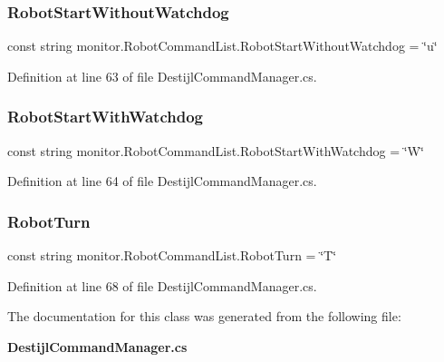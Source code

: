 \subsubsection{Robot\+Start\+Without\+Watchdog}
{\footnotesize\ttfamily const string monitor.\+Robot\+Command\+List.\+Robot\+Start\+Without\+Watchdog = \char`\"{}u\char`\"{}}



Definition at line 63 of file Destijl\+Command\+Manager.\+cs.

\mbox{\label{classmonitor_1_1_robot_command_list_aafa5d0e5fec3afe6586cca8b88d45c85}} 
\subsubsection{Robot\+Start\+With\+Watchdog}
{\footnotesize\ttfamily const string monitor.\+Robot\+Command\+List.\+Robot\+Start\+With\+Watchdog = \char`\"{}W\char`\"{}}



Definition at line 64 of file Destijl\+Command\+Manager.\+cs.

\mbox{\label{classmonitor_1_1_robot_command_list_a2b88fc42fba8229f163e03e7252a77e6}} 
\subsubsection{Robot\+Turn}
{\footnotesize\ttfamily const string monitor.\+Robot\+Command\+List.\+Robot\+Turn = \char`\"{}T\char`\"{}}



Definition at line 68 of file Destijl\+Command\+Manager.\+cs.



The documentation for this class was generated from the following file\+:\begin{DoxyCompactItemize}
\item 
\textbf{ Destijl\+Command\+Manager.\+cs}\end{DoxyCompactItemize}
